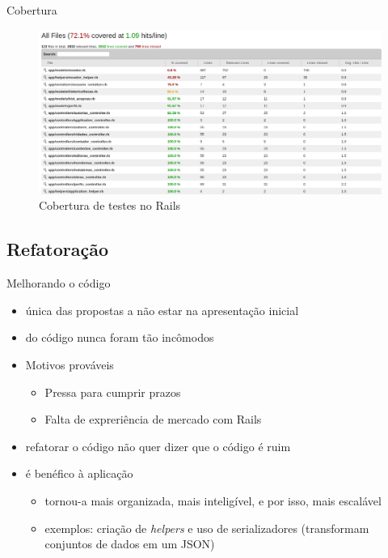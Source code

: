 \documentclass[aspectratio=43,display]{beamer}
\begin{document}
  \begin{frame}{Cobertura}
    \begin{figure}
      \centering
      \includegraphics[width=.9\textwidth]{../figuras/test_coverage.png}
      \caption{Cobertura de testes no Rails}
    \end{figure}
  \end{frame}

  \subsection{Refatoração}\label{subsec:refatoracao}

  \begin{frame}{Melhorando o código}
    \begin{itemize}
      \item única das propostas a não estar na apresentação inicial \pause
      \item {} do código nunca foram tão incômodos \pause %
      \item Motivos prováveis \pause
      \begin{itemize}
        \item Pressa para cumprir prazos \pause %
        \item Falta de expreriência de mercado com Rails \pause %
      \end{itemize}
      \item refatorar o código não quer dizer que o código é ruim \pause %
      \item é benéfico à aplicação \pause
      \begin{itemize}
        \item tornou-a mais organizada, mais inteligível, e por isso, mais escalável \pause %
        \item exemplos: criação de \emph{helpers} e uso de serializadores (transformam conjuntos de dados em um JSON)
      \end{itemize}
    \end{itemize}
  \end{frame}
\end{document}
